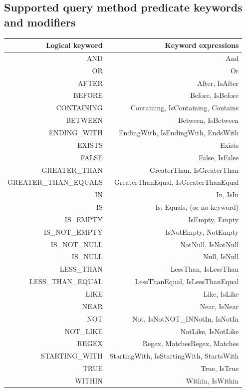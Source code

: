 \documentclass{scrartcl}
\begin{document}
\subsection{Supported query method predicate keywords and modifiers}

\begin{table}[ht]
\begin{tabular}{ | r | r |}
    \hline
    Logical keyword &	Keyword expressions \\
    \hline
    AND & And \\
    OR &  Or \\
    AFTER & After, IsAfter \\
    BEFORE & Before, IsBefore\\
    CONTAINING&Containing, IsContaining, Contains\\
    BETWEEN&Between, IsBetween\\
    ENDING\_WITH&EndingWith, IsEndingWith, EndsWith\\
    EXISTS&Exists\\
    FALSE&False, IsFalse\\
    GREATER\_THAN&GreaterThan, IsGreaterThan\\
    GREATER\_THAN\_EQUALS&GreaterThanEqual, IsGreaterThanEqual\\
    IN&In, IsIn\\
    IS&Is, Equals, (or no keyword)\\
    IS\_EMPTY&IsEmpty, Empty\\
    IS\_NOT\_EMPTY&IsNotEmpty, NotEmpty\\
    IS\_NOT\_NULL&NotNull, IsNotNull\\
    IS\_NULL&Null, IsNull\\
    LESS\_THAN&LessThan, IsLessThan\\
    LESS\_THAN\_EQUAL&LessThanEqual, IsLessThanEqual\\
    LIKE&Like, IsLike\\
    NEAR&Near, IsNear\\
    NOT&Not, IsNotNOT\_INNotIn, IsNotIn\\
    NOT\_LIKE&NotLike, IsNotLike\\
    REGEX&Regex, MatchesRegex, Matches\\
    STARTING\_WITH&StartingWith, IsStartingWith, StartsWith\\
    TRUE&True, IsTrue\\
    WITHIN&Within, IsWithin\\
    \hline
\end{tabular}
\end{table}
\end{document}
